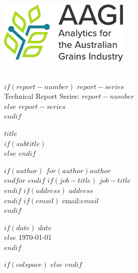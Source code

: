 \documentclass[$if(fontsize)$$fontsize$,$endif$$if(lang)$$lang$,$endif$$if(papersize)$$papersize$,$endif$$for(classoption)$$classoption$$sep$,$endfor$]{$documentclass$}
\begin{document}

\thispagestyle{empty}
\vspace*{-30mm}

\begin{center}
\includegraphics[height = 3cm]{assets/AAGI_logo}
\end{center}


\vfill

\begin{flushright}
\HRule\\[5mm]


\huge
$if(report-number)$
\textcolor{AAGI}{\sbf $report-series$ \\Technical Report Series: $report-number$}\\[6mm]
$else$
\textcolor{AAGI}{\sbf $report-series$}\\[6mm]
$endif$

{\sbf $title$}\\
\Large
$if(subtitle)$
\vspace{2mm}{\sbf $subtitle$}\\[5mm]
$else$
\vspace{2mm}
$endif$

\sf\normalsize
$if(author)$
$for(author)$$author$\\ $endfor$
$endif$
$if(job-title)$
$job-title$\\
$endif$
$if(address)$
$address$\\
$endif$
\vspace*{0.4cm}
$if(email)$
email:\;$email$\\[8mm]
$endif$


$if(date)$
$date$\\
$else$
\today\\
$endif$
\HRule
\end{flushright}



$if(colspace)$
\setlength{\tabcolsep}{$colspace$}
$else$
\setlength{\tabcolsep}{12pt}
$endif$

\vfill
\end{document}

